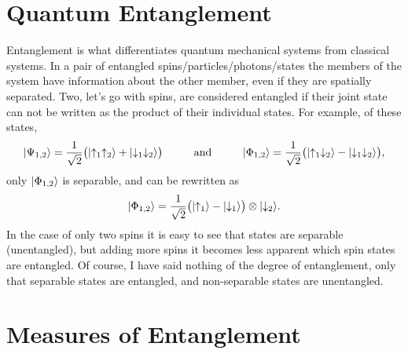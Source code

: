 \section{Quantum Entanglement}
Entanglement is what differentiates quantum mechanical systems from classical systems.
In a pair of entangled spins/particles/photons/states the members of the system have information about the other member, even if they are spatially separated.
Two, let's go with spins, are considered entangled if their joint state can not be written as the product of their individual states.  For example, of these states,
\begin{equation}
	\lvert {\Psi_{1,2}} \rangle = \frac{1}{\sqrt{2}} \big( \lvert {\uparrow_1\uparrow_2} \rangle + \lvert {\downarrow_1\downarrow_2} \rangle\big) 
	\hspace{1cm} \text{and} \hspace{1cm}
	\lvert {\Phi_{1,2}} \rangle = \frac{1}{\sqrt{2}} \big( \lvert {\uparrow_1\downarrow_2} \rangle - \lvert {\downarrow_1\downarrow_2} \rangle\big), 
\end{equation}
only $\lvert {\Phi_{1,2}} \rangle$ is separable, and can be rewritten as
\begin{equation}
	\lvert {\Phi_{1,2}} \rangle = \frac{1}{\sqrt{2}}  \big( \lvert {\uparrow_1} \rangle - \lvert {\downarrow_1} \rangle\big) \otimes \lvert {\downarrow_2} \rangle.
\end{equation}
In the case of only two spins it is easy to see that states are separable (unentangled), but adding more spins it becomes less apparent which spin states are entangled.
Of course, I have said nothing of the degree of entanglement, only that separable states are entangled, and non-separable states are unentangled.

\section{Measures of Entanglement}

